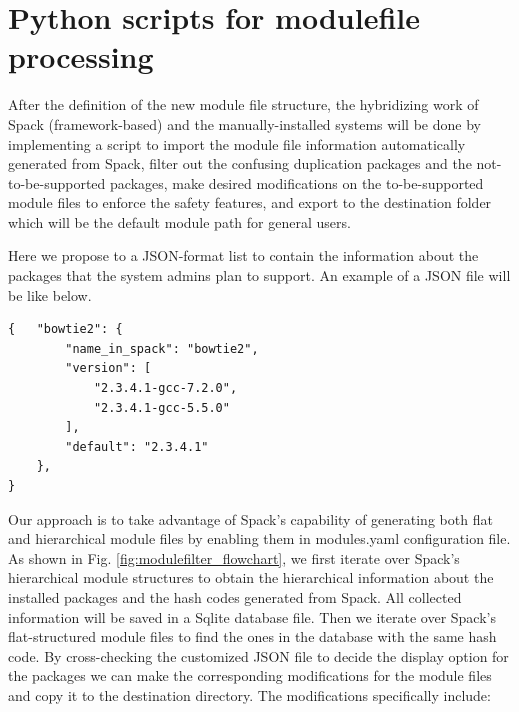 \documentclass[conference]{IEEEtran}
\begin{document}
\section{Python scripts for modulefile processing}\label{subsec_modulefile_processing}

After the definition of the new module file structure, the hybridizing work of Spack (framework-based) and the manually-installed systems will be done by implementing a script to import the module file information automatically generated from Spack, filter out the confusing duplication packages and the not-to-be-supported packages, make desired modifications on the to-be-supported module files to enforce the safety features, and export to the destination folder which will be the default module path for general users.

Here we propose to a JSON-format list to contain the information about the packages that the system admins plan to support. An example of a JSON file will be like below.

{\small
\begin{verbatim}
{   "bowtie2": {
        "name_in_spack": "bowtie2",
        "version": [
            "2.3.4.1-gcc-7.2.0",
            "2.3.4.1-gcc-5.5.0"
        ],
        "default": "2.3.4.1"
    },
}
\end{verbatim}
}


Our approach is to take advantage of Spack's capability of generating both flat and hierarchical module files by enabling them in modules.yaml configuration file. As shown in Fig. \ref{fig:modulefilter_flowchart}, we first iterate over Spack's hierarchical module structures to obtain the hierarchical information about the installed packages and the hash codes generated from Spack. All collected information will be saved in a Sqlite database file. Then we iterate over Spack's flat-structured module files to find the ones in the database with the same hash code. By cross-checking the customized JSON file to decide the display option for the packages we can make the corresponding modifications for the module files and copy it to the destination directory. The modifications specifically include:
\end{document}
